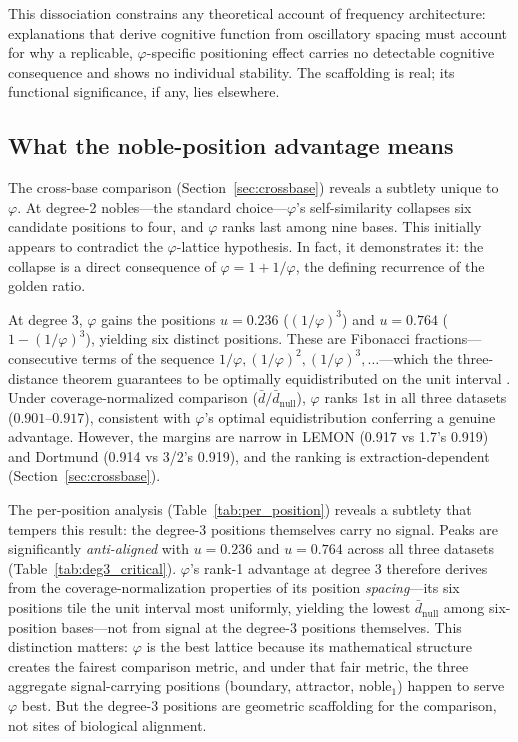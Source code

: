 \documentclass[11pt,a4paper]{article}
\newcommand{\phisym}{\varphi}
\begin{document}
This dissociation constrains any theoretical account of frequency architecture: explanations that derive cognitive function from oscillatory spacing must account for why a replicable, $\phisym$-specific positioning effect carries no detectable cognitive consequence and shows no individual stability. The scaffolding is real; its functional significance, if any, lies elsewhere.

\subsection{What the noble-position advantage means}

The cross-base comparison (Section~\ref{sec:crossbase}) reveals a subtlety unique to $\phisym$. At degree-2 nobles---the standard choice---$\phisym$'s self-similarity collapses six candidate positions to four, and $\phisym$ ranks last among nine bases. This initially appears to contradict the $\phisym$-lattice hypothesis. In fact, it demonstrates it: the collapse is a direct consequence of $\phisym = 1 + 1/\phisym$, the defining recurrence of the golden ratio.

At degree 3, $\phisym$ gains the positions $u = 0.236$ ($(1/\phisym)^3$) and $u = 0.764$ ($1 - (1/\phisym)^3$), yielding six distinct positions. These are Fibonacci fractions---consecutive terms of the sequence $1/\phisym, (1/\phisym)^2, (1/\phisym)^3, \ldots$---which the three-distance theorem guarantees to be optimally equidistributed on the unit interval \parencite{Slater1967}. Under coverage-normalized comparison ($\bar{d}/\bar{d}_{\text{null}}$), $\phisym$ ranks 1st in all three datasets ($0.901$--$0.917$), consistent with $\phisym$'s optimal equidistribution conferring a genuine advantage. However, the margins are narrow in LEMON (0.917 vs 1.7's 0.919) and Dortmund (0.914 vs 3/2's 0.919), and the ranking is extraction-dependent (Section~\ref{sec:crossbase}).

The per-position analysis (Table~\ref{tab:per_position}) reveals a subtlety that tempers this result: the degree-3 positions themselves carry no signal. Peaks are significantly \textit{anti-aligned} with $u = 0.236$ and $u = 0.764$ across all three datasets (Table~\ref{tab:deg3_critical}). $\phisym$'s rank-1 advantage at degree 3 therefore derives from the coverage-normalization properties of its position \textit{spacing}---its six positions tile the unit interval most uniformly, yielding the lowest $\bar{d}_{\text{null}}$ among six-position bases---not from signal at the degree-3 positions themselves. This distinction matters: $\phisym$ is the best lattice because its mathematical structure creates the fairest comparison metric, and under that fair metric, the three aggregate signal-carrying positions (boundary, attractor, noble$_1$) happen to serve $\phisym$ best. But the degree-3 positions are geometric scaffolding for the comparison, not sites of biological alignment.
\end{document}
